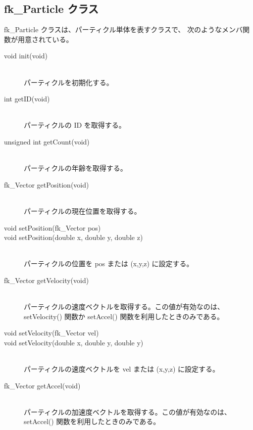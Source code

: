 \subsection{fk\_Particle クラス}
fk\_Particle クラスは、パーティクル単体を表すクラスで、
次のようなメンバ関数が用意されている。
\begin{description}
\item[void init(void)] ~ \\
	パーティクルを初期化する。\\

\item[int getID(void)] ~ \\
	パーティクルの ID を取得する。\\

\item[unsigned int getCount(void)] ~ \\
	パーティクルの年齢を取得する。\\

\item[fk\_Vector getPosition(void)] ~ \\
	パーティクルの現在位置を取得する。\\

\item[void setPosition(fk\_Vector pos)]
\item[void setPosition(double x, double y, double z)] ~ \\
	パーティクルの位置を pos または (x,y,z) に設定する。\\

\item[fk\_Vector getVelocity(void)] ~ \\
	パーティクルの速度ベクトルを取得する。この値が有効なのは、
	setVelocity() 関数か setAccel() 関数を利用したときのみである。\\

\item[void setVelocity(fk\_Vector vel)]
\item[void setVelocity(double x, double y, double y)] ~ \\
	パーティクルの速度ベクトルを vel または (x,y,z) に設定する。\\

\item[fk\_Vector getAccel(void)] ~ \\
	パーティクルの加速度ベクトルを取得する。この値が有効なのは、
	setAccel() 関数を利用したときのみである。\\


\end{description}
